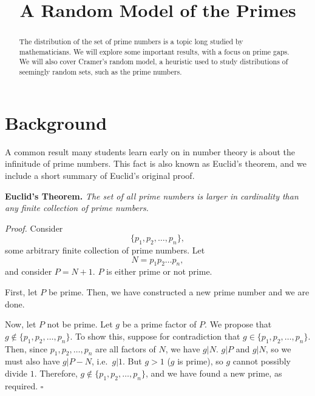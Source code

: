 \documentclass[conference]{IEEEtran}
\begin{document}
\title{A Random Model of the Primes}
\author{
\and
{}
\and
{}
}

\maketitle
\thispagestyle{plain}

\begin{abstract}
The distribution of the set of prime numbers is a topic long studied by mathematicians. We will explore some important results, with a focus on prime gaps. We will also cover Cramer's random model, a heuristic used to study distributions of seemingly random sets, such as the prime numbers. 
\end{abstract}

\section{Background}

A common result many students learn early on in number theory is about the
infinitude of prime numbers. This fact is also known as Euclid's theorem,
and we include a short summary of Euclid's original proof.

\medskip\noindent
\textbf{Euclid's Theorem.} \textit{The set of all prime numbers is larger
in cardinality than any finite collection of prime numbers.}

\smallskip\noindent
\textit{Proof.} Consider \[\{p_1, p_2, \dots, p_n\},\] some arbitrary finite
collection of
prime numbers. Let \[N = p_1p_2 \dots p_n,\] and consider $P = N + 1$. $P$ is
either prime or not prime.

First, let $P$ be prime. Then, we have constructed a new prime number and
we are done.

Now, let $P$ not be prime. Let $g$ be a prime factor of $P$. We propose that
$g \notin \{p_1, p_2, \dots, p_n\}$. To show this, suppose for contradiction that
$g \in \{p_1, p_2, \dots, p_n\}$. Then, since $p_1, p_2, \dots, p_n$ are all
factors of $N$, we have $g | N$. $g | P$ and $g | N$, so
we must also have $g | P - N$, i.e.\ $g | 1$. But $g > 1$ ($g$ is prime),
so $g$ cannot possibly divide $1$. Therefore,
$g \notin \{p_1, p_2, \dots, p_n\}$, and we have found a new prime, as
required. \hfill$\square$\medskip
\end{document}
